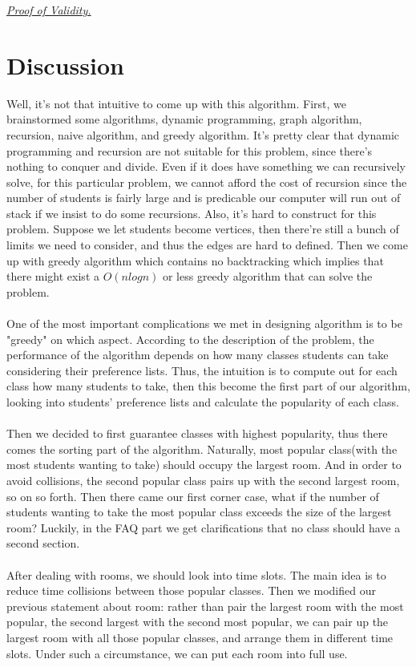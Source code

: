 \documentclass[11pt, oneside]{article}   	%
\begin{document}
\underline{\textit{Proof of Validity.}}

\section{Discussion}
Well, it's not that intuitive to come up with this algorithm. First, we brainstormed some algorithms, dynamic programming, graph algorithm, recursion, naive algorithm, and greedy algorithm. It's pretty clear that dynamic programming and recursion are not suitable for this problem, since there's nothing to conquer and divide. Even if it does have something we can recursively solve, for this particular problem, we cannot afford the cost of recursion since the number of students is fairly large and is predicable our computer will run out of stack if we insist to do some recursions. Also, it's hard to construct for this problem. Suppose we let students become vertices, then there're still a bunch of limits we need to consider, and thus the edges are hard to defined. Then we come up with greedy algorithm which contains no backtracking which implies that there might exist a $O(nlogn)$ or less greedy algorithm that can solve the problem.\\
\\One of the most important complications we met in designing algorithm is to be "greedy" on which aspect. According to the description of the problem, the performance of the algorithm depends on how many classes students can take considering their preference lists. Thus, the intuition is to compute out for each class how many students to take, then this become the first part of our algorithm, looking into students' preference lists and calculate the popularity of each class.\\
\\ Then we decided to first guarantee classes with highest popularity, thus there comes the sorting part of the algorithm. Naturally, most popular class(with the most students wanting to take) should occupy the largest room. And in order to avoid collisions, the second popular class pairs up with the second largest room, so on so forth. Then there came our first corner case, what if the number of students wanting to take the most popular class exceeds the size of the largest room? Luckily, in the FAQ part we get clarifications that no class should have a second section.\\
\\ After dealing with rooms, we should look into time slots. The main idea is to reduce time collisions between those popular classes. Then we modified our previous statement about room: rather than pair the largest room with the most popular, the second largest with the second most popular, we can pair up the largest room with all those popular classes, and arrange them in different time slots. Under such a circumstance, we can put each room into full use.\\
\end{document}
